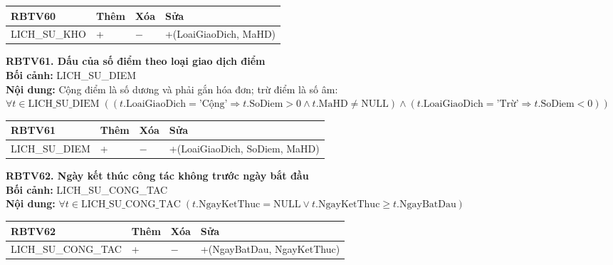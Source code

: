 \documentclass[11pt, a4paper]{article}
\begin{document}
\vspace{0.3em}
\begin{small}
\begin{tabularx}{\textwidth}{| C{4.2cm} | C{2cm} | C{2cm} | Y |}
\hline
\textbf{RBTV60} & \textbf{Thêm} & \textbf{Xóa} & \textbf{Sửa} \\
\hline
LICH\_SU\_KHO & + & $-$ & +(LoaiGiaoDich, MaHD) \\
\hline
\end{tabularx}
\end{small}

\vspace{0.8em}
\textbf{RBTV61. Dấu của số điểm theo loại giao dịch điểm} \\
\textbf{Bối cảnh:} LICH\_SU\_DIEM \\
\textbf{Nội dung:} Cộng điểm là số dương và phải gắn hóa đơn; trừ điểm là số âm: \\
$\forall t \in \text{LICH\_SU\_DIEM} \; ((t.\text{LoaiGiaoDich} = \text{'Cộng'} \Rightarrow t.\text{SoDiem} > 0 \land t.\text{MaHD} \neq \text{NULL}) \land (t.\text{LoaiGiaoDich} = \text{'Trừ'} \Rightarrow t.\text{SoDiem} < 0))$

\vspace{0.3em}
\begin{small}
\begin{tabularx}{\textwidth}{| C{4.2cm} | C{2cm} | C{2cm} | Y |}
\hline
\textbf{RBTV61} & \textbf{Thêm} & \textbf{Xóa} & \textbf{Sửa} \\
\hline
LICH\_SU\_DIEM & + & $-$ & +(LoaiGiaoDich, SoDiem, MaHD) \\
\hline
\end{tabularx}
\end{small}

\vspace{0.8em}
\textbf{RBTV62. Ngày kết thúc công tác không trước ngày bắt đầu} \\
\textbf{Bối cảnh:} LICH\_SU\_CONG\_TAC \\
\textbf{Nội dung:} $\forall t \in \text{LICH\_SU\_CONG\_TAC} \; (t.\text{NgayKetThuc} = \text{NULL} \lor t.\text{NgayKetThuc} \ge t.\text{NgayBatDau})$

\vspace{0.3em}
\begin{small}
\begin{tabularx}{\textwidth}{| C{4.2cm} | C{2cm} | C{2cm} | Y |}
\hline
\textbf{RBTV62} & \textbf{Thêm} & \textbf{Xóa} & \textbf{Sửa} \\
\hline
LICH\_SU\_CONG\_TAC & + & $-$ & +(NgayBatDau, NgayKetThuc) \\
\hline
\end{tabularx}
\end{small}
\end{document}

